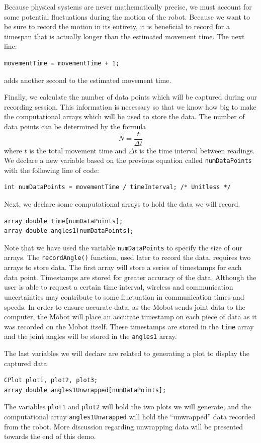 \documentclass{article}
\begin{document}
Because physical systems are never mathematically precise, we must account for some
potential fluctuations during the motion of the robot. Because we want to be sure 
to record the motion in its entirety, it is beneficial to record for a timespan that
is actually longer than the estimated movement time. The next line:
\begin{verbatim}
movementTime = movementTime + 1; 
\end{verbatim}
adds another second to the estimated movement time.

Finally, we calculate the number of data points which will be captured during our 
recording session. This information is necessary so that we know how big to make
the computational arrays which will be used to store the data. The number
of data points can be determined by the formula
\begin{equation*}
N = \frac{t}{\Delta t}
\end{equation*}
where $t$ is the total movement time and $\Delta t$ is the time interval between
readings. We declare a new variable based on the previous equation called \texttt{numDataPoints} with 
the following line of code:
\begin{verbatim}
int numDataPoints = movementTime / timeInterval; /* Unitless */
\end{verbatim}

Next, we declare some computational arrays to hold the data we will record.
\begin{verbatim}
array double time[numDataPoints];
array double angles1[numDataPoints];
\end{verbatim}
Note that we have used the variable \texttt{numDataPoints} to specify the size
of our arrays. The \texttt{recordAngle()} function, used later to record the data,
requires two arrays to store data. The first array will store a series of timestamps
for each data point. Timestamps are stored for greater accuracy of the data. Although
the user is able to request a certain time interval, wireless and communication 
uncertainties may contribute to some fluctuation in communication times and speeds. 
In order to ensure accurate data, as the Mobot sends joint data to the computer, 
the Mobot will place an accurate timestamp on each piece of data as it was recorded
on the Mobot itself. These timestamps are stored in the \texttt{time} array and
the joint angles will be stored in the \texttt{angles1} array.

The last variables we will declare are related to generating a plot to display
the captured data. 
\begin{verbatim}
CPlot plot1, plot2, plot3;
array double angles1Unwrapped[numDataPoints];
\end{verbatim}
The variables \texttt{plot1} and \texttt{plot2} will hold the two plots we will
generate, and the computational array \texttt{angles1Unwrapped} will hold
the ``unwrapped'' data recorded from the robot. More discussion regarding
unwrapping data will be presented towards the end of this demo.
\end{document}

